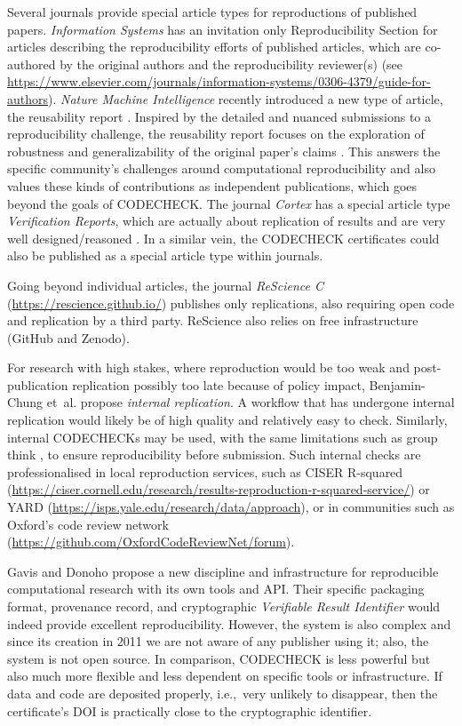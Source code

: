 \documentclass[12pt]{article}
\begin{document}
Several journals provide special article types for reproductions of
published papers.  \emph{Information Systems} has an invitation only
Reproducibility Section for articles describing the reproducibility 
efforts of published articles, which are co-authored by the original
authors and the reproducibility reviewer(s) (see
\url{https://www.elsevier.com/journals/information-systems/0306-4379/guide-for-authors}).
\emph{Nature Machine Intelligence} recently introduced a new type of
article, the reusability report \cite{noauthor_research_2020}.
Inspired by the detailed and nuanced submissions to a reproducibility
challenge, the reusability report focuses on the exploration of
robustness and generalizability of the original paper's claims
\cite{noauthor_research_2020}. This answers the specific community's
challenges around computational reproducibility and also values these
kinds of contributions as independent publications, which goes beyond
the goals of CODECHECK.  The journal \emph{Cortex} has a special
article type \emph{Verification Reports}, which are actually about
replication of results and are very well designed/reasoned
\cite{chambers_verification_2020}.  In a similar vein, the CODECHECK
certificates could also be published as a special article type within
journals.

Going beyond individual articles, the journal \emph{ReScience C}
(\url{https://rescience.github.io/}) publishes only replications, also
requiring open code and replication by a third party. ReScience also
relies on free infrastructure (GitHub and Zenodo).

For research with high stakes, where reproduction would be too weak and
post-publication replication possibly too late because of policy impact,
Benjamin-Chung et~al. \cite{benjamin-chung_internal_2020} propose
\emph{internal replication}.
A workflow that has undergone internal
replication would likely be of high quality and relatively easy to check.
Similarly, internal CODECHECKs may be used, with the same limitations such
as group think \cite{benjamin-chung_internal_2020},
to ensure reproducibility before submission.
Such internal checks are professionalised in local reproduction services,
such as CISER R-squared
(\url{https://ciser.cornell.edu/research/results-reproduction-r-squared-service/})
or YARD (\url{https://isps.yale.edu/research/data/approach}),
or in communities such as Oxford's code review network (\url{https://github.com/OxfordCodeReviewNet/forum}).

Gavis and Donoho \cite{gavish_universal_2011} propose a new discipline
and infrastructure for reproducible computational research with its
own tools and API. Their specific packaging format, provenance record,
and cryptographic \emph{Verifiable Result Identifier} would indeed
provide excellent reproducibility. However, the system is also complex
and since its creation in 2011 we are not aware of any publisher using
it; also, the system is not open source.  In comparison,
CODECHECK is less powerful but also much more flexible and less
dependent on specific tools or infrastructure. If data and code are
deposited properly, i.e.,~very unlikely to disappear, then the
certificate's DOI is practically close to the cryptographic
identifier.
\end{document}
